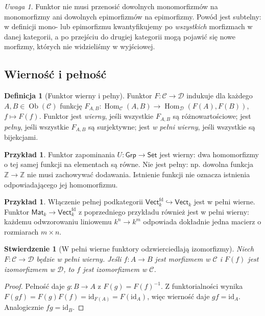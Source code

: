 \documentclass[11pt,a4paper]{article}
\numberwithin{equation}{section}
\theoremstyle{plain}
\newtheorem{stwierdzenie}[twierdzenie]{Stwierdzenie}
\theoremstyle{definition}
\newtheorem{definicja}[twierdzenie]{Definicja}
\newtheorem{przyklad}[twierdzenie]{Przykład}
\theoremstyle{remark}
\newtheorem{uwaga}[twierdzenie]{Uwaga}
\newcommand{\cat}[1]{\mathsf{#1}}
\newcommand{\Set}{\cat{Set}}
\newcommand{\Grp}{\cat{Grp}}
\newcommand{\Vect}{\cat{Vect}}
\newcommand{\id}{\mathrm{id}}
\newcommand{\Hom}{\operatorname{Hom}}
\newcommand{\Ob}{\operatorname{Ob}}
\begin{document}
\begin{uwaga}
Funktor nie musi przenosić dowolnych monomorfizmów na monomorfizmy ani dowolnych epimorfizmów na epimorfizmy. Powód jest subtelny: w definicji mono- lub epimorfizmu kwantyfikujemy po \emph{wszystkich} morfizmach w danej kategorii, a po przejściu do drugiej kategorii mogą pojawić się nowe morfizmy, których nie widzieliśmy w wyjściowej.
\end{uwaga}

\subsection{Wierność i pełność}

\begin{definicja}[Funktor wierny i pełny]\label{def:pelny}
Funktor $F:\mathcal C\to\mathcal D$ indukuje dla każdego $A,B\in\Ob(\mathcal C)$ funkcję $F_{A,B}:\Hom_{\mathcal C}(A,B)\to\Hom_{\mathcal D}(F(A),F(B))$, $f\mapsto F(f)$. Funktor jest \emph{wierny}, jeśli wszystkie $F_{A,B}$ są różnowartościowe; jest \emph{pełny}, jeśli wszystkie $F_{A,B}$ są surjektywne; jest \emph{w pełni wierny}, jeśli wszystkie są bijekcjami.
\end{definicja}

\begin{przyklad}
Funktor zapominania $U:\Grp\to\Set$ jest wierny: dwa homomorfizmy o tej samej funkcji na elementach są równe. Nie jest pełny: np. dowolna funkcja $\mathbb Z\to\mathbb Z$ nie musi zachowywać dodawania. Istnienie funkcji nie oznacza istnienia odpowiadającego jej homomorfizmu.
\end{przyklad}

\begin{przyklad}
Włączenie pełnej podkategorii $\Vect_k^{\mathrm{fd}}\hookrightarrow\Vect_k$ jest w pełni wierne. Funktor $\cat{Mat}_k\to\Vect_k^{\mathrm{fd}}$ z poprzedniego przykładu również jest w pełni wierny: każdemu odwzorowaniu liniowemu $k^n\to k^m$ odpowiada dokładnie jedna macierz o rozmiarach $m\times n$.
\end{przyklad}


\begin{stwierdzenie}[W pełni wierne funktory odzwierciedlają izomorfizmy]\label{tw:ff-reflect-iso}
Niech $F:\mathcal C\to\mathcal D$ będzie w pełni wierny. Jeśli $f:A\to B$ jest morfizmem w $\mathcal C$ i $F(f)$ jest izomorfizmem w $\mathcal D$, to $f$ jest izomorfizmem w $\mathcal C$.
\end{stwierdzenie}
\begin{proof}
Pełność daje $g:B\to A$ z $F(g)=F(f)^{-1}$. Z funktorialności wynika $F(gf)=F(g)F(f)=\id_{F(A)}=F(\id_A)$, więc wierność daje $gf=\id_A$. Analogicznie $fg=\id_B$.
\end{proof}
\end{document}
